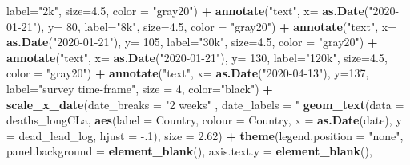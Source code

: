 \documentclass[
]{article}
\newenvironment{Shaded}{\begin{snugshade}}{\end{snugshade}}
\newcommand{\DataTypeTok}[1]{\textcolor[rgb]{0.13,0.29,0.53}{#1}}
\newcommand{\DecValTok}[1]{\textcolor[rgb]{0.00,0.00,0.81}{#1}}
\newcommand{\FloatTok}[1]{\textcolor[rgb]{0.00,0.00,0.81}{#1}}
\newcommand{\KeywordTok}[1]{\textcolor[rgb]{0.13,0.29,0.53}{\textbf{#1}}}
\newcommand{\NormalTok}[1]{#1}
\newcommand{\OperatorTok}[1]{\textcolor[rgb]{0.81,0.36,0.00}{\textbf{#1}}}
\newcommand{\StringTok}[1]{\textcolor[rgb]{0.31,0.60,0.02}{#1}}
\begin{document}
\begin{Shaded}
\begin{Highlighting}[]
{{{           \DataTypeTok{label=}\StringTok{"2k"}\NormalTok{, }\DataTypeTok{size=}\FloatTok{4.5}\NormalTok{, }\DataTypeTok{color =} \StringTok{"gray20"}\NormalTok{) }\OperatorTok{+}
\StringTok{  }\KeywordTok{annotate}\NormalTok{(}\StringTok{"text"}\NormalTok{, }\DataTypeTok{x=} \KeywordTok{as.Date}\NormalTok{(}\StringTok{"2020-01-21"}\NormalTok{), }\DataTypeTok{y=} \DecValTok{80}\NormalTok{, }
           \DataTypeTok{label=}\StringTok{"8k"}\NormalTok{, }\DataTypeTok{size=}\FloatTok{4.5}\NormalTok{, }\DataTypeTok{color =} \StringTok{"gray20"}\NormalTok{) }\OperatorTok{+}
\StringTok{  }\KeywordTok{annotate}\NormalTok{(}\StringTok{"text"}\NormalTok{, }\DataTypeTok{x=} \KeywordTok{as.Date}\NormalTok{(}\StringTok{"2020-01-21"}\NormalTok{), }\DataTypeTok{y=} \DecValTok{105}\NormalTok{, }
           \DataTypeTok{label=}\StringTok{"30k"}\NormalTok{, }\DataTypeTok{size=}\FloatTok{4.5}\NormalTok{, }\DataTypeTok{color =} \StringTok{"gray20"}\NormalTok{) }\OperatorTok{+}
\StringTok{  }\KeywordTok{annotate}\NormalTok{(}\StringTok{"text"}\NormalTok{, }\DataTypeTok{x=} \KeywordTok{as.Date}\NormalTok{(}\StringTok{"2020-01-21"}\NormalTok{), }\DataTypeTok{y=} \DecValTok{130}\NormalTok{, }
           \DataTypeTok{label=}\StringTok{"120k"}\NormalTok{, }\DataTypeTok{size=}\FloatTok{4.5}\NormalTok{, }\DataTypeTok{color =} \StringTok{"gray20"}\NormalTok{) }\OperatorTok{+}
\StringTok{  }\KeywordTok{annotate}\NormalTok{(}\StringTok{"text"}\NormalTok{, }\DataTypeTok{x=} \KeywordTok{as.Date}\NormalTok{(}\StringTok{"2020-04-13"}\NormalTok{), }\DataTypeTok{y=}\DecValTok{137}\NormalTok{, }\DataTypeTok{label=}\StringTok{"survey time-frame"}\NormalTok{, }\DataTypeTok{size =} \DecValTok{4}\NormalTok{, }\DataTypeTok{color=}\StringTok{"black"}\NormalTok{) }\OperatorTok{+}
\StringTok{  }\KeywordTok{scale_x_date}\NormalTok{(}\DataTypeTok{date_breaks =} \StringTok{"2 weeks"}\NormalTok{ , }\DataTypeTok{date_labels =} \StringTok{"%
\StringTok{  }\KeywordTok{geom_text}\NormalTok{(}\DataTypeTok{data =}\NormalTok{ deaths_longCLa, }\KeywordTok{aes}\NormalTok{(}\DataTypeTok{label =}\NormalTok{ Country, }\DataTypeTok{colour =}\NormalTok{ Country, }\DataTypeTok{x =} \KeywordTok{as.Date}\NormalTok{(date), }\DataTypeTok{y =}\NormalTok{ dead_lead_log, }\DataTypeTok{hjust =} \FloatTok{-.1}\NormalTok{), }\DataTypeTok{size =} \FloatTok{2.62}\NormalTok{) }\OperatorTok{+}
\StringTok{  }\KeywordTok{theme}\NormalTok{(}\DataTypeTok{legend.position =} \StringTok{"none"}\NormalTok{,}
        \DataTypeTok{panel.background =} \KeywordTok{element_blank}\NormalTok{(),}
        \DataTypeTok{axis.text.y =} \KeywordTok{element_blank}\NormalTok{(),}
}}}}
\end{Highlighting}
\end{Shaded}
\end{document}
